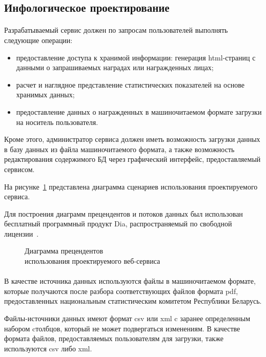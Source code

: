 \subsection{Инфологическое проектирование}
\label{ssub:db_info_stage}

\paragraph{}
Разрабатываемый сервис должен по запросам пользователей выполнять
следующие операции:
\begin{itemize}
\item
  предоставление доступа к хранимой информации: генерация html-страниц с данными
  о запрашиваемых наградах или награжденных лицах;
\item
  расчет и наглядное представление статистических показателей на
  основе хранимых данных;
\item
  предоставление данных о награжденных в машиночитаемом формате 
  загрузки на носитель пользователя. 
\end{itemize}

Кроме этого, администратор сервиса должен иметь возможность загрузки данных в базу данных
из файла машиночитаемого формата, а также возможность редактирования содержимого БД
через графический интерфейс, предоставляемый сервисом.

На рисунке~\ref{fig:use-case_diagram} представлена диаграмма сценариев
использования проектируемого сервиса.

Для построения диаграмм прецендентов и потоков данных был использован бесплатный
программный продукт Dia, распространяемый по свободной лицензии~\cite{dia_license}.

\begin{figure}[h!]
  \centering
  \small{
    
  }
  \caption{Диаграмма прецендентов \\ использования проектируемого веб-сервиса}
  \label{fig:use-case_diagram}
\end{figure}

\paragraph{}
В качестве источника данных используются файлы в машиночитаемом формате,
которые получаются после разбора соответствующих файлов формата pdf,
предоставленных национальным статистическим комитетом Республики Беларусь.

Файлы-источники данных имеют формат csv или xml c заранее определенным
набором cтолбцов, который не может подвергаться изменениям.
В качестве формата файлов, предоставляемых пользователям для загрузки,
также используются csv либо xml.

